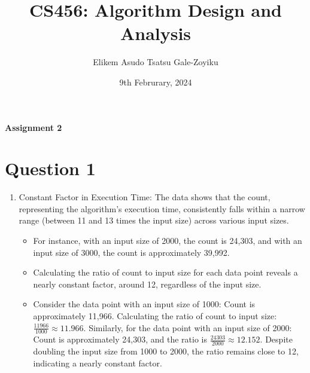 \documentclass{article}
\title{\textbf{CS456: Algorithm Design and Analysis}}
\author{Elikem Asudo Tsatsu Gale-Zoyiku}
\date{9th Februrary, 2024}
\begin{document}
\maketitle
\begin{center}
    \begin{large}
        \textbf{Assignment 2\\}
    \end{large}
\end{center}
\newpage
\section*{Question 1}
\begin{enumerate}
    \item Constant Factor in Execution Time:
          The data shows that the count, representing the algorithm's execution time, consistently falls within a narrow range (between 11 and 13 times the input size) across various input sizes.
          \begin{itemize}
              \item For instance, with an input size of 2000, the count is 24,303, and with an input size of 3000, the count is approximately 39,992.
              \item Calculating the ratio of count to input size for each data point reveals a nearly constant factor, around 12, regardless of the input size.
              \item Consider the data point with an input size of 1000: Count is approximately 11,966.
                    Calculating the ratio of count to input size: \( \frac{11966}{1000} \approx 11.966 \).
                    Similarly, for the data point with an input size of 2000: Count is approximately 24,303, and the ratio is \( \frac{24303}{2000} \approx 12.152 \).
                    Despite doubling the input size from 1000 to 2000, the ratio remains close to 12, indicating a nearly constant factor.
          \end{itemize}


\end{enumerate}
\end{document}
